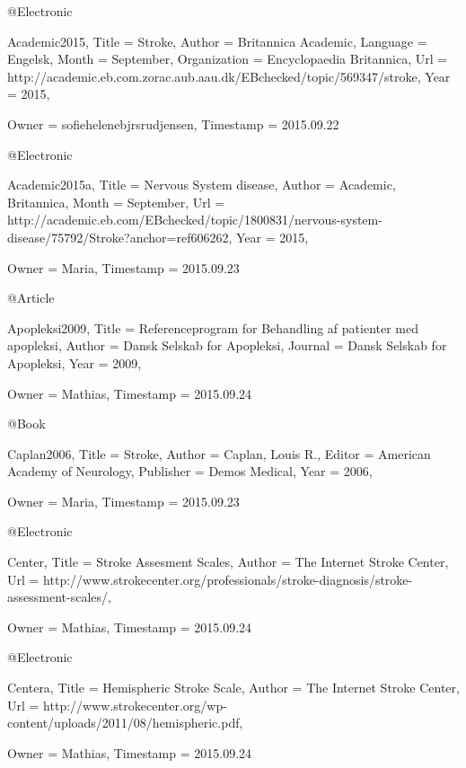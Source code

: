 @Electronic{Academic2015,
  Title                    = {Stroke},
  Author                   = {Britannica Academic},
  Language                 = {Engelsk},
  Month                    = {September},
  Organization             = {Encyclopaedia Britannica},
  Url                      = {http://academic.eb.com.zorac.aub.aau.dk/EBchecked/topic/569347/stroke},
  Year                     = {2015},

  Owner                    = {sofiehelenebjrsrudjensen},
  Timestamp                = {2015.09.22}
}

@Electronic{Academic2015a,
  Title                    = {Nervous System disease},
  Author                   = {Academic, Britannica},
  Month                    = {September},
  Url                      = {http://academic.eb.com/EBchecked/topic/1800831/nervous-system-disease/75792/Stroke?anchor=ref606262},
  Year                     = {2015},

  Owner                    = {Maria},
  Timestamp                = {2015.09.23}
}

@Article{Apopleksi2009,
  Title                    = {Referenceprogram for Behandling af patienter med apopleksi},
  Author                   = {Dansk Selskab for Apopleksi},
  Journal                  = {Dansk Selskab for Apopleksi},
  Year                     = {2009},

  Owner                    = {Mathias},
  Timestamp                = {2015.09.24}
}

@Book{Caplan2006,
  Title                    = {Stroke},
  Author                   = {Caplan, Louis R.},
  Editor                   = {American Academy of Neurology},
  Publisher                = {Demos Medical},
  Year                     = {2006},

  Owner                    = {Maria},
  Timestamp                = {2015.09.23}
}

@Electronic{Center,
  Title                    = {Stroke Assesment Scales},
  Author                   = {The Internet Stroke Center},
  Url                      = {http://www.strokecenter.org/professionals/stroke-diagnosis/stroke-assessment-scales/},

  Owner                    = {Mathias},
  Timestamp                = {2015.09.24}
}

@Electronic{Centera,
  Title                    = {Hemispheric Stroke Scale},
  Author                   = {The Internet Stroke Center},
  Url                      = {http://www.strokecenter.org/wp-content/uploads/2011/08/hemispheric.pdf},

  Owner                    = {Mathias},
  Timestamp                = {2015.09.24}
}

